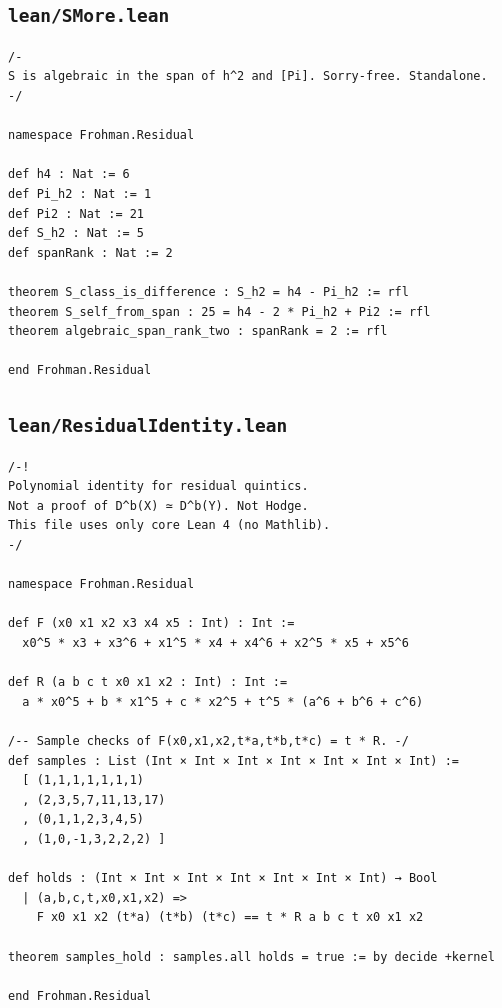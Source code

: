 \documentclass[11pt]{amsart}
\theoremstyle{definition}
\theoremstyle{remark}
\begin{document}
\subsection*{\texttt{lean/SMore.lean}}
\begin{verbatim}
/-
S is algebraic in the span of h^2 and [Pi]. Sorry-free. Standalone.
-/

namespace Frohman.Residual

def h4 : Nat := 6
def Pi_h2 : Nat := 1
def Pi2 : Nat := 21
def S_h2 : Nat := 5
def spanRank : Nat := 2

theorem S_class_is_difference : S_h2 = h4 - Pi_h2 := rfl
theorem S_self_from_span : 25 = h4 - 2 * Pi_h2 + Pi2 := rfl
theorem algebraic_span_rank_two : spanRank = 2 := rfl

end Frohman.Residual
\end{verbatim}
\subsection*{\texttt{lean/ResidualIdentity.lean}}
\begin{verbatim}
/-!
Polynomial identity for residual quintics.
Not a proof of D^b(X) ≃ D^b(Y). Not Hodge.
This file uses only core Lean 4 (no Mathlib).
-/ 

namespace Frohman.Residual

def F (x0 x1 x2 x3 x4 x5 : Int) : Int :=
  x0^5 * x3 + x3^6 + x1^5 * x4 + x4^6 + x2^5 * x5 + x5^6

def R (a b c t x0 x1 x2 : Int) : Int :=
  a * x0^5 + b * x1^5 + c * x2^5 + t^5 * (a^6 + b^6 + c^6)

/-- Sample checks of F(x0,x1,x2,t*a,t*b,t*c) = t * R. -/
def samples : List (Int × Int × Int × Int × Int × Int × Int) :=
  [ (1,1,1,1,1,1,1)
  , (2,3,5,7,11,13,17)
  , (0,1,1,2,3,4,5)
  , (1,0,-1,3,2,2,2) ]

def holds : (Int × Int × Int × Int × Int × Int × Int) → Bool
  | (a,b,c,t,x0,x1,x2) =>
    F x0 x1 x2 (t*a) (t*b) (t*c) == t * R a b c t x0 x1 x2

theorem samples_hold : samples.all holds = true := by decide +kernel

end Frohman.Residual
\end{verbatim}
\end{document}
